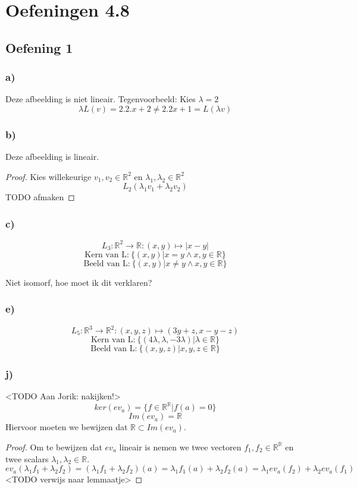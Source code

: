 \documentclass[lineaire_algebra_oplossingen.tex]{subfiles}
\begin{document}
\section{Oefeningen 4.8}
\subsection{Oefening 1}
\subsubsection*{a)}
Deze afbeelding is niet lineair. Tegenvoorbeeld: Kies $\lambda = 2$\\
\[
\lambda L(v) = 2 . 2 . x + 2 \neq 2 . 2 x + 1 = L(\lambda v)
\]

\subsubsection*{b)}
Deze afbeelding is lineair.
\begin{proof}
Kies willekeurige $v_1, v_2 \in \mathbb{R}^2$ en $\lambda_1, \lambda_2 \in \mathbb{R}^2$
\[
L_2(\lambda_1v_1 + \lambda_2v_2)
\]
TODO afmaken
\end{proof}

\subsubsection*{c)}
$$
L_3:\mathbb{R}^2\rightarrow\mathbb{R}:(x,y)\mapsto |x-y|
$$
$$
\text{Kern van L:} \ \{(x,y)|x=y \wedge x,y \in \mathbb{R} \}
$$
$$
\text{Beeld van L:} \ \{(x,y)|x\neq y \wedge x,y \in \mathbb{R} \}
$$
\begin{center}
Niet isomorf, hoe moet ik dit verklaren?
\end{center}

\subsubsection*{e)}
$$
L_5:\mathbb{R}^3\rightarrow\mathbb{R}^2:(x,y,z)\mapsto (3y+z,x-y-z)
$$
$$
\text{Kern van L:} \ \{(4\lambda ,\lambda ,-3\lambda)|\lambda \in \mathbb{R} \}
$$
$$
\text{Beeld van L:} \ \{(x ,y ,z)|x,y,z \in \mathbb{R} \}
$$

\subsubsection*{j)}
<TODO Aan Jorik: nakijken!>
\[
ker(ev_a) = \{ f \in \mathbb{R}^{\mathbb{R}} | f(a) = 0\}
\]
\[
Im(ev_a) = \mathbb{R}
\]
Hiervoor moeten we bewijzen dat $\mathbb{R} \subset Im(ev_a)$.
\begin{proof}
Om te bewijzen dat $ev_a$ lineair is nemen we twee vectoren $f_1,f_2 \in \mathbb{R}^{\mathbb{R}}$ en twee scalars $\lambda_1, \lambda_2 \in \mathbb{R}$.
\[
ev_a(\lambda_1f_1 + \lambda_2f_2) = (\lambda_1f_1 + \lambda_2f_2)(a) = \lambda_1f_1(a) + \lambda_2f_2(a) = \lambda_1ev_a(f_2) + \lambda_2ev_a(f_1)
\]
<TODO verwijs naar lemmaatje>
\end{proof}
\end{document}
